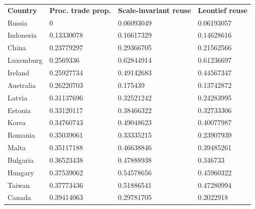 \documentclass[english]{uzhpub}
\renewcommand{\baselinestretch}{1.5}
\begin{document}
\renewcommand{\baselinestretch}{1.0}

\begin{table}[]
\centering
\begin{tabular}{llll}
\textbf{Country}                                           & \textbf{Proc. trade prop.}       & \textbf{Scale-invariant reuse} & \textbf{Leontief reuse} \\
Russia                                                     & 0          & 0.06093049            & 0.06193057     \\
Indonesia                                                  & 0.13330078 & 0.16617329            & 0.14628616     \\
China                                                      & 0.23779297 & 0.29366705            & 0.21562566     \\
Luxemburg                                                  & 0.2569336  & 0.62844914            & 0.61236697     \\
Ireland                                                    & 0.25927734 & 0.49142683            & 0.44567347     \\
Australia                                                  & 0.26220703 & 0.175439              & 0.13742872     \\
Latvia                                                     & 0.31137696 & 0.32521242            & 0.24283995     \\
Estonia                                                    & 0.33120117 & 0.38466322            & 0.32733306     \\
Korea                                                      & 0.34760743 & 0.49048623            & 0.40077987     \\
Romania                                                    & 0.35039061 & 0.33335215            & 0.23907939     \\
Malta                                                      & 0.35117188 & 0.46638846            & 0.39485261     \\
Bulgaria                                                   & 0.36523438 & 0.47888938            & 0.346733       \\
Hungary                                                    & 0.37539062 & 0.54578656            & 0.45960322     \\
Taiwan                                                     & 0.37773436 & 0.51886541            & 0.47280994     \\
Canada                                                     & 0.39414063 & 0.29781705            & 0.2022918      \\

\end{tabular}
\end{table}
\end{document}
